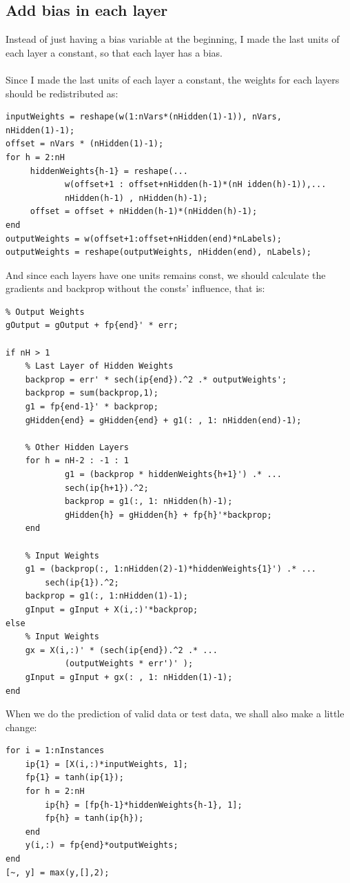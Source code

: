 \documentclass[12pt]{article}
\begin{document}
\subsection{Add bias in each layer}
Instead of just having a bias variable at the beginning, I made the last units of each layer a constant, so that each layer has a bias.\\
\\
Since I made the last units of each layer a constant, the weights for each layers should be redistributed as:
\begin{lstlisting}
inputWeights = reshape(w(1:nVars*(nHidden(1)-1)), nVars, nHidden(1)-1);
offset = nVars * (nHidden(1)-1);
for h = 2:nH
	 hiddenWeights{h-1} = reshape(...
            w(offset+1 : offset+nHidden(h-1)*(nH idden(h)-1)),...
            nHidden(h-1) , nHidden(h)-1);	
	 offset = offset + nHidden(h-1)*(nHidden(h)-1);
end
outputWeights = w(offset+1:offset+nHidden(end)*nLabels);
outputWeights = reshape(outputWeights, nHidden(end), nLabels);
\end{lstlisting}
And since each layers have one units remains const, we should calculate the gradients and backprop without the consts' influence, that is:
\begin{lstlisting}
% Output Weights
gOutput = gOutput + fp{end}' * err;

if nH > 1
	% Last Layer of Hidden Weights
	backprop = err' * sech(ip{end}).^2 .* outputWeights';
	backprop = sum(backprop,1);
	g1 = fp{end-1}' * backprop;
	gHidden{end} = gHidden{end} + g1(: , 1: nHidden(end)-1);

	% Other Hidden Layers
	for h = nH-2 : -1 : 1
			g1 = (backprop * hiddenWeights{h+1}') .* ...
			sech(ip{h+1}).^2;
			backprop = g1(:, 1: nHidden(h)-1);
			gHidden{h} = gHidden{h} + fp{h}'*backprop;
	end

	% Input Weights
	g1 = (backprop(:, 1:nHidden(2)-1)*hiddenWeights{1}') .* ...
		sech(ip{1}).^2;
	backprop = g1(:, 1:nHidden(1)-1);
	gInput = gInput + X(i,:)'*backprop;
else
	% Input Weights
	gx = X(i,:)' * (sech(ip{end}).^2 .* ...
			(outputWeights * err')' );
	gInput = gInput + gx(: , 1: nHidden(1)-1);
end
\end{lstlisting}
When we do the prediction of valid data or test data, we shall also make a little change:
\begin{lstlisting}
for i = 1:nInstances
    ip{1} = [X(i,:)*inputWeights, 1];
    fp{1} = tanh(ip{1});
    for h = 2:nH
        ip{h} = [fp{h-1}*hiddenWeights{h-1}, 1];
        fp{h} = tanh(ip{h});
    end
    y(i,:) = fp{end}*outputWeights;
end
[~, y] = max(y,[],2);
\end{lstlisting}
\end{document}
